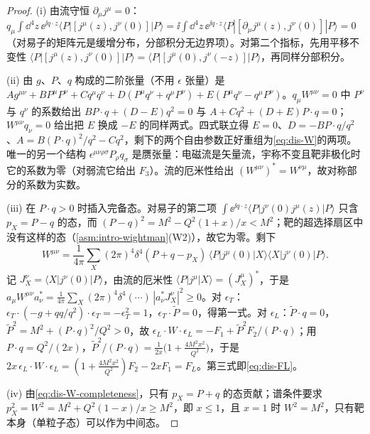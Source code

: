 \begin{proof}
(i) 由流守恒 $\partial_\mu j^\mu=0$：$q_\mu\int\dd^4z\,\ee^{\ii q\cdot z}\langle P|[j^\mu(z),j^\nu(0)]|P\rangle=\ii\int\dd^4z\,\ee^{\ii q\cdot z}\langle P|[\partial_\mu j^\mu(z),j^\nu(0)]|P\rangle=0$（对易子的矩阵元是缓增分布，分部积分无边界项）。对第二个指标，先用平移不变性 $\langle P|[j^\mu(z),j^\nu(0)]|P\rangle=\langle P|[j^\mu(0),j^\nu(-z)]|P\rangle$，再同样分部积分。

(ii) 由 $g$、$P$、$q$ 构成的二阶张量（不用 $\epsilon$ 张量）是 $Ag^{\mu\nu}+BP^\mu P^\nu+Cq^\mu q^\nu+D(P^\mu q^\nu+q^\mu P^\nu)+E(P^\mu q^\nu-q^\mu P^\nu)$。$q_\mu W^{\mu\nu}=0$ 中 $P^\nu$ 与 $q^\nu$ 的系数给出 $BP\cdot q+(D-E)q^2=0$ 与 $A+Cq^2+(D+E)P\cdot q=0$；$W^{\mu\nu}q_\nu=0$ 给出把 $E$ 换成 $-E$ 的同样两式。四式联立得 $E=0$、$D=-BP\cdot q/q^2$、$A=B(P\cdot q)^2/q^2-Cq^2$，剩下的两个自由参数正好重组为\cref{eq:dis-W}的两项。唯一的另一个结构 $\epsilon^{\mu\nu\rho\sigma}P_\rho q_\sigma$ 是赝张量：电磁流是矢量流，宇称不变且靶非极化时它的系数为零（对弱流它给出 $F_3$）。流的厄米性给出 $(W^{\mu\nu})^*=W^{\nu\mu}$，故对称部分的系数为实数。

(iii) 在 $P\cdot q>0$ 时插入完备态。对易子的第二项 $\int\ee^{\ii q\cdot z}\langle P|j^\nu(0)j^\mu(z)|P\rangle$ 只含 $p_X=P-q$ 的态，而 $(P-q)^2=M^2-Q^2(1+x)/x<M^2$；靶的超选择扇区中没有这样的态（\cref{asm:intro-wightman}(W2)），故它为零。剩下
\begin{equation}\label{eq:dis-W-completeness}
W^{\mu\nu}=\frac1{4\pi}\sum_X(2\pi)^4\delta^4(P+q-p_X)\,\langle P|j^\mu(0)|X\rangle\langle X|j^\nu(0)|P\rangle .
\end{equation}
记 $J^\nu_X=\langle X|j^\nu(0)|P\rangle$，由流的厄米性 $\langle P|j^\mu|X\rangle=(J^\mu_X)^*$，于是 $a_\mu W^{\mu\nu}a^*_\nu=\frac1{4\pi}\sum_X(2\pi)^4\delta^4(\cdots)\,|a^*_\nu J^\nu_X|^2\ge0$。对 $\epsilon_T$：$\epsilon_T\cdot(-g+qq/q^2)\cdot\epsilon_T=-\epsilon_T^2=1$，$\epsilon_T\cdot\tilde P=0$，得第一式。对 $\epsilon_L$：$\tilde P\cdot q=0$，$\tilde P^2=M^2+(P\cdot q)^2/Q^2>0$，故 $\epsilon_L\cdot W\cdot\epsilon_L=-F_1+\tilde P^2F_2/(P\cdot q)$；用 $P\cdot q=Q^2/(2x)$，$\tilde P^2/(P\cdot q)=\frac1{2x}\big(1+\frac{4M^2x^2}{Q^2}\big)$，于是 $2x\,\epsilon_L\cdot W\cdot\epsilon_L=(1+\frac{4M^2x^2}{Q^2})F_2-2xF_1=F_L$。第三式即\cref{eq:dis-FL}。

(iv) 由\cref{eq:dis-W-completeness}，只有 $p_X=P+q$ 的态贡献；谱条件要求 $p_X^2=W^2=M^2+Q^2(1-x)/x\ge M^2$，即 $x\le1$，且 $x=1$ 时 $W^2=M^2$，只有靶本身（单粒子态）可以作为中间态。
\end{proof}

